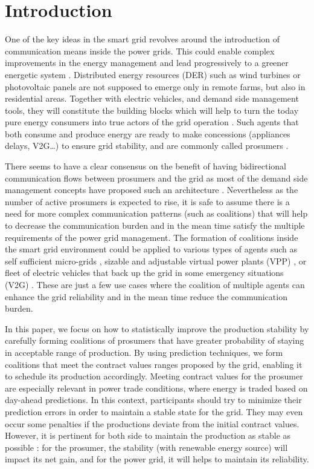 \documentclass[conference]{IEEEtran}
\begin{document}
\section{Introduction}
\label{sec:introduction}

One of the key ideas in the smart grid revolves around the introduction of communication means inside the power grids. This could enable complex improvements in the energy management and lead progressively to a greener energetic system \cite{Ramchurn} \cite{WuHamedHuangBook2011}. Distributed energy resources (DER) such as wind turbines or photovoltaic panels are not supposed to emerge only in remote farms, but also in residential areas. Together with electric vehicles, and demand side management tools, they will constitute the building blocks which will help to turn the today pure energy consumers into true actors of the grid operation \cite{Ramchurn}. Such agents that both consume and produce energy are ready to make concessions (appliances delays, V2G…) to ensure grid stability, and are commonly called prosumers \cite{Rathnayaka2012} \cite{Ramchurn}.

There seems to have a clear consensus on the benefit of having bidirectional communication flows between prosumers and the grid as most of the demand side management concepts have proposed such an architecture \cite{WuHamedHuangBook2011}. Nevertheless as the number of active prosumers is expected to rise, it is safe to assume there is a need for more complex communication patterns (such as coalitions) that will help to decrease the communication burden and in the mean time satisfy the multiple requirements of the power grid management. The formation of coalitions inside the smart grid environment could be applied to various types of agents such as self sufficient micro-grids \cite{Pahwa}, sizable and adjustable virtual power plants (VPP) \cite{Braun} \cite{Ramchurn}, or fleet of electric vehicles that back up the grid in some emergency situations (V2G) \cite{Ramchurn}. These are just a few use cases where the coalition of multiple agents can enhance the grid reliability and in the mean time reduce the communication burden.

In this paper, we focus on how to statistically improve the production stability by carefully forming coalitions of prosumers that have greater probability of staying in acceptable range of production. By using prediction techniques, we form coalitions that meet the contract values ranges proposed by the grid, enabling it to schedule its production accordingly. Meeting contract values for the prosumer are especially relevant in power trade conditions, where energy is traded based on day-ahead predictions. In this context, participants should try to minimize their prediction errors in order to maintain a stable state for the grid. They may even occur some penalties if the productions deviate from the initial contract values. However, it is pertinent for both side to maintain the production as stable as possible : for the prosumer, the stability (with renewable energy source) will impact its net gain, and for the power grid, it will helps to maintain its reliability.
\end{document}
